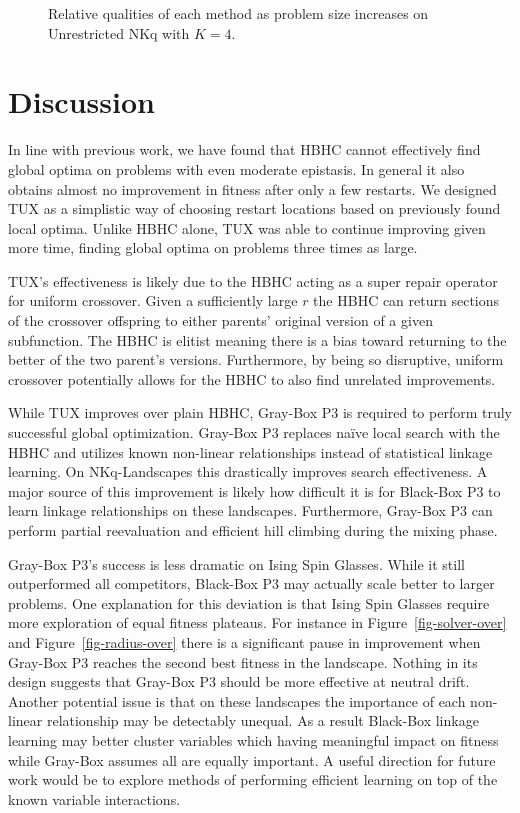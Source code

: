 \begin{figure}
  \centering
  \caption{Relative qualities of each method as problem size increases on Unrestricted NKq
  with $K=4$.}
  \label{fig-length-un}
\end{figure}

\section{Discussion}
In line with previous work, we have found that HBHC cannot effectively find global optima
on problems with even moderate epistasis. In general it also obtains almost no improvement
in fitness after only a few restarts. We designed TUX as a simplistic way of choosing
restart locations based on previously found local optima. Unlike HBHC alone, TUX
was able to continue improving given more time, finding global optima on problems three
times as large.

TUX's effectiveness is likely due to the HBHC acting as a super repair operator for uniform crossover.
Given a sufficiently large $r$ the HBHC can return sections of the crossover offspring to either
parents' original version of a given subfunction. The HBHC is elitist meaning there is a bias toward
returning to the better of the two parent's versions. Furthermore, by being so disruptive,
uniform crossover potentially allows for the HBHC to also find unrelated improvements.

While TUX improves over plain HBHC, Gray-Box P3 is required to perform truly successful
global optimization. Gray-Box P3 replaces na\"{i}ve local search with the HBHC and utilizes
known non-linear relationships instead of statistical linkage learning. On NKq-Landscapes this drastically
improves search effectiveness. A major source of this improvement is likely how difficult it is
for Black-Box P3 to learn linkage relationships on these landscapes. Furthermore, Gray-Box P3
can perform partial reevaluation and efficient hill climbing during the mixing phase.

Gray-Box P3's success is less dramatic on Ising Spin Glasses.
While it still outperformed all competitors, Black-Box P3 may actually scale better to larger
problems. One explanation for this deviation is that Ising Spin Glasses require more
exploration of equal fitness plateaus. For instance in Figure~\ref{fig-solver-over} and Figure~\ref{fig-radius-over}
there is a significant pause in improvement when Gray-Box P3 reaches the second best fitness in the landscape.
Nothing in its design suggests that Gray-Box P3 should be more effective at neutral drift. Another potential
issue is that on these landscapes the importance of each non-linear relationship may be detectably unequal.
As a result Black-Box linkage learning may better cluster variables which having meaningful
impact on fitness while Gray-Box assumes all are equally important. A useful direction for future work
would be to explore methods of performing efficient learning on top of the known variable interactions.

